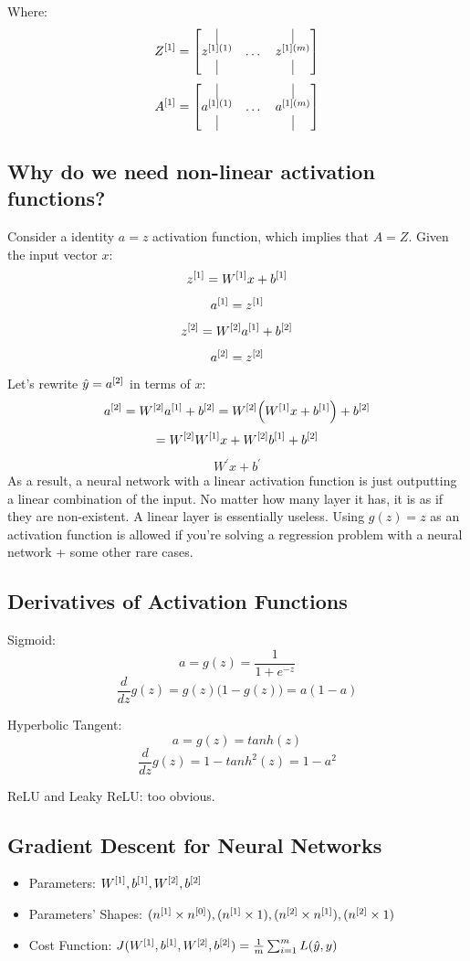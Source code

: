 Where: 
$$
Z\lay{1} = \begin{bmatrix}
\vline & & \vline \\
z^{[1](1)} & \dots & z^{[1](m)}\\
\vline & & \vline \\
\end{bmatrix}
$$
$$
A\lay{1} = \begin{bmatrix}
\vline & & \vline \\
a^{[1](1)} & \dots & a^{[1](m)}\\
\vline & & \vline \\
\end{bmatrix}
$$

\subsection{Why do we need non-linear activation functions?}
Consider a identity $a=z$ activation function, which implies that $A=Z$. Given the input vector $x$: 
$$
z^{[1]}=W^{[1]}x+b^{[1]}
$$
$$
a^{[1]}=z^{[1]}
$$
$$
z^{[2]}=W^{[2]}a^{[1]}+b^{[2]}
$$
$$
a^{[2]}=z^{[2]}
$$
Let's rewrite $\hat{y} = a^{[2]}$ in terms of $x$: 
$$
a^{[2]} = W^{[2]}a^{[1]}+b^{[2]} = W^{[2]}\Big(W^{[1]}x+b^{[1]}\Big)+b^{[2]}
$$
$$
= W^{[2]}W^{[1]}x + W^{[2]}b^{[1]} + b^{[2]}
$$
$$
W^{'}x + b^{'}
$$
As a result, a neural network with a linear activation function is just outputting a linear combination of the input. No matter how many layer it has, it is as if they are non-existent. A linear layer is essentially useless. Using $g(z)=z$ as an activation function is allowed if you're solving a regression problem with a neural network + some other rare cases.

\subsection{Derivatives of Activation Functions}

Sigmoid: 
$$
a = g(z)=\frac{1}{1+e^{-z}}
$$ 
$$
\frac{d}{dz}g(z)=g(z)\Big(1-g(z)\Big) = a(1-a)
$$

Hyperbolic Tangent: 
$$
a= g(z) = tanh(z)
$$
$$
\frac{d}{dz}g(z)= 1-tanh^2(z)=1-a^2
$$

ReLU and Leaky ReLU: too obvious. 

\subsection{Gradient Descent for Neural Networks}
\begin{itemize}
	\item Parameters: $W^{[1]}, b^{[1]}, W^{[2]}, b^{[2]}$
	\item Parameters' Shapes: $(n^{[1]}\times n^{[0]}), (n^{[1]}\times 1), (n^{[2]}\times n^{[1]}), (n^{[2]}\times 1)$
	\item Cost Function: $J(W^{[1]}, b^{[1]}, W^{[2]}, b^{[2]}) = \frac{1}{m} \sum_{i=1}^{m}L(\hat{y}, y)$
\end{itemize}

